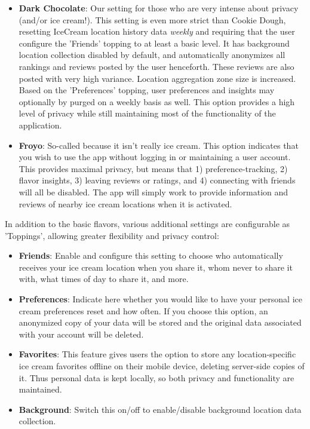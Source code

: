 \documentclass{article}
\providecommand{\tightlist}{
    \setlength{\itemsep}{0pt}\setlength{\parskip}{0pt}
}
\begin{document}
\begin{itemize}
  \item \textbf{Dark Chocolate}: Our setting for those who are very intense about privacy (and/or ice cream!). This setting is even more strict than Cookie Dough, resetting IceCream location history data \textit{weekly} and requiring that the user configure the 'Friends' topping to at least a basic level. It has background location collection disabled by default, and automatically anonymizes all rankings and reviews posted by the user henceforth. These reviews are also posted with very high variance. Location aggregation zone size is increased. Based on the 'Preferences' topping, user preferences and insights may optionally by purged on a weekly basis as well. This option provides a high level of privacy while still maintaining most of the functionality of the application.
  \item \textbf{Froyo}: So-called because it isn't really ice cream. This option indicates that you wish to use the app without logging in or maintaining a user account. This provides maximal privacy, but means that 1) preference-tracking, 2) flavor insights, 3) leaving reviews or ratings, and 4) connecting with friends will all be disabled. The app will simply work to provide information and reviews of nearby ice cream locations when it is activated.
\end{itemize}

In addition to the basic flavors, various additional settings are configurable as 'Toppings', allowing greater flexibility and privacy control:
\begin{itemize}\tightlist
  \item \textbf{Friends}: Enable and configure this setting to choose who automatically receives your ice cream location when you share it, whom never to share it with, what times of day to share it, and more.
  \item \textbf{Preferences}: Indicate here whether you would like to have your personal ice cream preferences reset and how often. If you choose this option, an anonymized copy of your data will be stored and the original data associated with your account will be deleted.
  \item \textbf{Favorites}: This feature gives users the option to store any location-specific ice cream favorites offline on their mobile device, deleting server-side copies of it. Thus personal data is kept locally, so both privacy and functionality are maintained.
  \item \textbf{Background}: Switch this on/off to enable/disable background location data collection.
\end{itemize}
\end{document}
